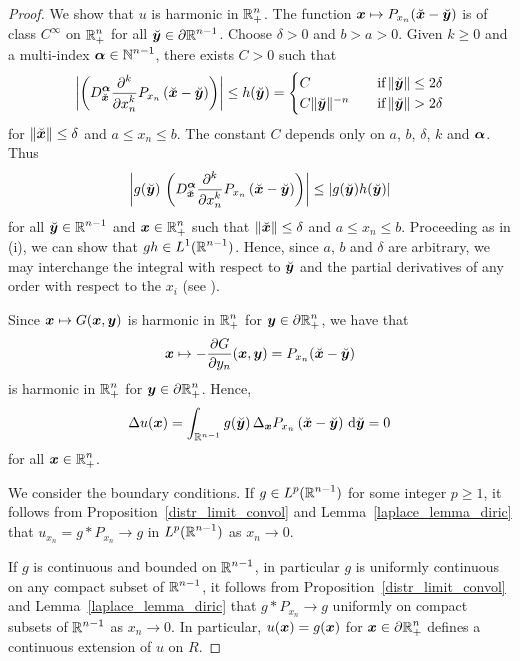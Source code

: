 \begin{proof}
 We show that $u$ is harmonic in $\displaystyle \RR^n_+$.
The function $\VEC{x} \mapsto P_{x_n}( \breve{\VEC{x}} - \breve{\VEC{y}} )$
is of class $\displaystyle C^\infty$ on $\displaystyle \RR^n_+$ for all
$\displaystyle \breve{\VEC{y}} \in \partial \RR^{n-1}$.
Choose $\delta>0$ and $b>a>0$.  Given $k\geq 0$ and a multi-index
$\displaystyle \VEC{\alpha} \in \NN^{n-1}$, there exists $C>0$ such that
\[
\left| \left( D^{\VEC{\alpha}}_{\breve{\VEC{x}}}
\pdfdxn{ P_{x_n}\left(\breve{\VEC{x}} - \breve{\VEC{y}}\right)}{x_n}{k} \right)
\right| 
\leq h(\breve{\VEC{y}}) =
\begin{cases}
C & \quad \text{if} \left\|\breve{\VEC{y}}\right\| \leq 2\delta \\
C\|\breve{\VEC{y}}\|^{-n} & \quad \text{if}
\left\|\breve{\VEC{y}}\right\| > 2\delta
\end{cases}
\]
for $\|\breve{\VEC{x}}\|\leq \delta$ and $a \leq x_n \leq b$.   The constant
$C$ depends only on $a$, $b$, $\delta$, $k$ and $\VEC{\alpha}$.  Thus
\[
\left|g(\breve{\VEC{y}})\, \left( D^{\VEC{\alpha}}_{\breve{\VEC{x}}}
\pdfdxn{ P_{x_n}\left(\breve{\VEC{x}} - \breve{\VEC{y}}\right)}{x_n}{k} \right)
\right| \leq \left|g(\breve{\VEC{y}})h(\breve{\VEC{y}})\right|
\]
for all $\displaystyle \breve{\VEC{y}} \in \RR^{n-1}$ and
$\displaystyle \VEC{x} \in \RR^n_+$ such that
$\|\breve{\VEC{x}}\|\leq \delta$ and $a \leq x_n \leq b$.  Proceeding
as in (i), we can show that $\displaystyle g h \in L^1(\RR^{n-1})$.
Hence, since $a$, $b$ and $\delta$ are arbitrary, we may interchange the
integral with respect to $\breve{\VEC{y}}$ and the partial
derivatives of any order with respect to the $x_i$ (see \cite{Flem}).

Since $\VEC{x} \mapsto G(\VEC{x}, \VEC{y})$ is harmonic in
$\displaystyle \RR^n_+$ for
$\displaystyle \VEC{y} \in \partial \RR^n_+$, we have that
\[
\VEC{x} \mapsto -\pdydx{G}{y_n}(\VEC{x},\VEC{y})
= P_{x_n}(\breve{\VEC{x}}-\breve{\VEC{y}})
\]
is harmonic in $\displaystyle \RR^n_+$ for
$\displaystyle \VEC{y} \in \partial \RR^n_+$.
Hence,
\[
\Delta u(\VEC{x}) = 
\int_{\RR^{n-1}} g(\breve{\VEC{y}})\,
\Delta_{\VEC{x}} P_{x_n}\left(\breve{\VEC{x}} - \breve{\VEC{y}}\right)
\dx{\breve{\VEC{y}}} = 0
\]
for all $\displaystyle \VEC{x} \in \RR^n_+$.

 We consider the boundary conditions.
If $\displaystyle g\in L^p(\RR^{n-1})$ for some integer $p \geq 1$, it
follows from Proposition~\ref{distr_limit_convol} and
Lemma~\ref{laplace_lemma_diric} that
$u_{x_n} = g \ast P_{x_n} \rightarrow g$ in $\displaystyle L^p(\RR^{n-1})$ as
$x_n \rightarrow 0$.

 If $g$ is continuous and bounded on $\displaystyle \RR^{n-1}$, in
particular $g$ is uniformly continuous on any compact subset of
$\displaystyle \RR^{n-1}$, it follows from
Proposition~\ref{distr_limit_convol} and
Lemma~\ref{laplace_lemma_diric} that
$g \ast P_{x_n} \rightarrow g$ uniformly on compact subsets of
$\displaystyle \RR^{n-1}$ as $x_n \rightarrow 0$.  In particular,
$u(\VEC{x}) = g(\VEC{x})$ for
$\displaystyle \VEC{x} \in \partial \RR^n_+$ defines a
continuous extension of $u$ on $R$.
\end{proof}

